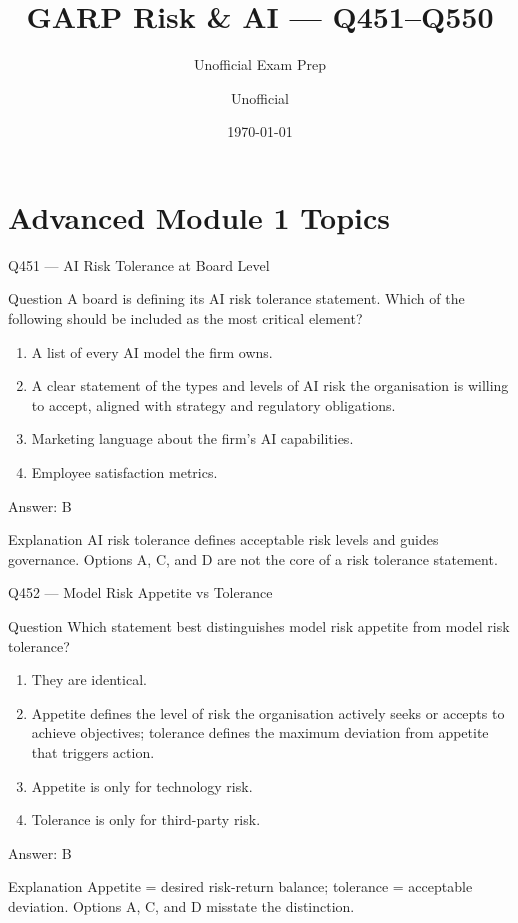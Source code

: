 \documentclass[aspectratio=169,8pt]{beamer}
\title[GARP RAI]{GARP Risk \& AI --- Q451--Q550}
\subtitle{Unofficial Exam Prep}
\author{Unofficial}
\date{\today}
\begin{document}
	
	\begin{frame}
		\titlepage
	\end{frame}
	
	\section{Advanced Module 1 Topics}
	
	\begin{frame}{Q451 --- AI Risk Tolerance at Board Level}
		\begin{block}{Question}
			A board is defining its AI risk tolerance statement. Which of the following should be included as the most critical element?
			\begin{enumerate}
				\item A list of every AI model the firm owns.
				\item A clear statement of the types and levels of AI risk the organisation is willing to accept, aligned with strategy and regulatory obligations.
				\item Marketing language about the firm's AI capabilities.
				\item Employee satisfaction metrics.
			\end{enumerate}
		\end{block}
		\begin{exampleblock}{Answer: B}\end{exampleblock}
		\begin{block}{Explanation}
			AI risk tolerance defines acceptable risk levels and guides governance. Options A, C, and D are not the core of a risk tolerance statement.
		\end{block}
	\end{frame}
	
	\begin{frame}{Q452 --- Model Risk Appetite vs Tolerance}
		\begin{block}{Question}
			Which statement best distinguishes model risk appetite from model risk tolerance?
			\begin{enumerate}
				\item They are identical.
				\item Appetite defines the level of risk the organisation actively seeks or accepts to achieve objectives; tolerance defines the maximum deviation from appetite that triggers action.
				\item Appetite is only for technology risk.
				\item Tolerance is only for third-party risk.
			\end{enumerate}
		\end{block}
		\begin{exampleblock}{Answer: B}\end{exampleblock}
		\begin{block}{Explanation}
			Appetite = desired risk-return balance; tolerance = acceptable deviation. Options A, C, and D misstate the distinction.
		\end{block}
	\end{frame}
	
\end{document}
